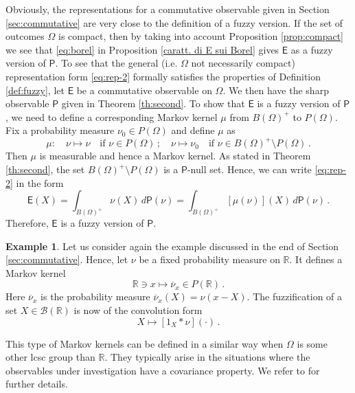 \documentclass[12pt]{amsart}
\theoremstyle{definition}
\newtheorem{example}{Example}
\newcommand{\R}{\mathbb R} %
\newcommand{\Eo}{\mathsf{E}} %
\newcommand{\PP}{\mathsf{P}} %
\newcommand{\bor}[1]{\mathcal{B}(#1)} %
\newcommand{\de}{\, d}
\begin{document}
Obviously, the representations for a commutative observable given in Section \ref{sec:commutative} are very close to the definition of a fuzzy version. If the set of outcomes $\Omega$ is compact, then by taking into account Proposition \ref{prop:compact} we see that \eqref{eq:borel} in Proposition \ref{caratt. di E sui Borel} gives $\Eo$ as a fuzzy version of $\PP$.
To see that the general (i.e. $\Omega$ not necessarily compact) representation form \eqref{eq:rep-2} formally satisfies the properties of Definition \ref{def:fuzzy}, let $\Eo$ be a commutative observable on $\Omega$. We then have the sharp observable $\PP$ given in Theorem \ref{th:second}. To show that $\Eo$ is a fuzzy version of $\PP$, we need to define a corresponding Markov kernel $\mu$ from $B(\Omega)^+$ to $P(\Omega)$. Fix a probability measure $\nu_0\in P(\Omega)$ and define $\mu$ as
\begin{equation*}
\mu:\quad \nu \mapsto \nu \quad \textrm{if $\nu\in P(\Omega)$} \, ; \quad \nu \mapsto \nu_{0} \quad  \textrm{if $\nu\in B(\Omega)^+\setminus P(\Omega)$}\, .
\end{equation*}
Then $\mu$ is measurable and hence a Markov kernel. As stated in Theorem \ref{th:second}, the set $B(\Omega)^+ \setminus P(\Omega)$ is a $\PP$-null set. Hence, we can write \eqref{eq:rep-2} in the form
\begin{equation*}
\Eo(X) = \int_{B(\Omega)^+} \nu(X) \de \PP(\nu) = \int_{B(\Omega)^+} [\mu(\nu)](X) \de \PP(\nu) \, .
\end{equation*}
Therefore, $\Eo$ is a fuzzy version of $\PP$.


\begin{example}\label{ex:covariant-markov}
Let us consider again the example discussed in the end of Section \ref{sec:commutative}. Hence, let $\nu$ be a fixed probability measure on $\R$. It defines a Markov kernel
\begin{equation*}
\R \ni x \mapsto \overline{\nu}_x \in P(\R)\, .
\end{equation*}
Here $\overline{\nu}_x$ is the probability measure $\overline{\nu}_x(X)=\nu(x-X)$. The fuzzification of a set $X\in\bor{\R}$ is now of the convolution form
\begin{equation*}
X \mapsto [1_X \ast \nu](\cdot) \, .
\end{equation*}

This type of Markov kernels can be defined in a similar way when $\Omega$ is some other lcsc group than $\R$. They typically arise in the situations where the observables under investigation have a covariance property. We refer to \cite{HeLaYl04} for further details.
\end{example}
\end{document}

